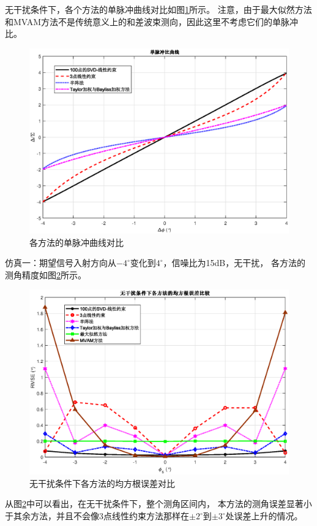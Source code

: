 \documentclass[master]{thesis-uestc}
\begin{document}
无干扰条件下，各个方法的单脉冲曲线对比如图\ref{SVD-JLC_MRC_cmp}所示。
注意，由于最大似然方法和MVAM方法不是传统意义上的和差波束测向，因此这里不考虑它们的单脉冲比。
\begin{figure}[H]
    \includegraphics[scale=0.5]{pic/SVD-JLC_MRC_cmp.eps}
    \caption{各方法的单脉冲曲线对比}
    \label{SVD-JLC_MRC_cmp}
\end{figure}

仿真一：期望信号入射方向从$-4^\circ$变化到$4^\circ$，信噪比为15dB，无干扰，
各方法的测角精度如图\ref{SVD-JLC_RMSE_jamming_free}所示。
\begin{figure}[H]
    \includegraphics[scale=0.5]{pic/SVD-JLC_RMSE_jamming_free.eps}
    \caption{无干扰条件下各方法的均方根误差对比}
    \label{SVD-JLC_RMSE_jamming_free}
\end{figure}
从图\ref{SVD-JLC_RMSE_jamming_free}中可以看出，在无干扰条件下，整个测角区间内，
本方法的测角误差显著小于其余方法，并且不会像3点线性约束方法那样在$\pm2^\circ$到$\pm3^\circ$处误差上升的情况。
\end{document}

